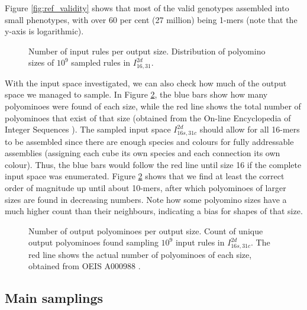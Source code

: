 Figure \ref{fig:ref_validity} shows that most of the valid genotypes assembled into small phenotypes, with over 60 per cent (27 million) being 1-mers (note that the y-axis is logarithmic). 

\begin{figure}[h]
    \centering
    \caption{Number of input rules per output size. Distribution of polyomino sizes of \(10^9\) sampled rules in \(I_{16,31}^{2d}\).
    }
    \label{fig:ref_distr}
\end{figure}

With the input space investigated, we can also check how much of the output space we managed to sample. In Figure \ref{fig:ref_distr}, the blue bars show how many polyominoes were found of each size, while the red line shows the total number of polyominoes that exist of that size (obtained from the On-line Encyclopedia of Integer Sequences \cite{sloane1995encyclopedia, oeisA000988}). The sampled input space \(I_{16s,31c}^{2d}\) should allow for all 16-mers to be assembled since there are enough species and colours for fully addressable assemblies (assigning each cube its own species and each connection its own colour). Thus, the blue bars would follow the red line until size 16 if the complete input space was enumerated. Figure \ref{fig:ref_distr} shows that we find at least the correct order of magnitude up until about 10-mers, after which polyominoes of larger sizes are found in decreasing numbers. Note how some polyomino sizes have a much higher count than their neighbours, indicating a bias for shapes of that size.

\begin{figure}[h]
    \centering
    \caption{Number of output polyominoes per output size. Count of unique output polyominoes found sampling \(10^9\) input rules in \(I_{16s,31c}^{2d}\). The red line shows the actual number of polyominoes of each size, obtained from OEIS A000988 \cite{sloane1995encyclopedia, oeisA000988}.
    }
    \label{fig:ref_distr}
\end{figure}


\subsection{Main samplings}


